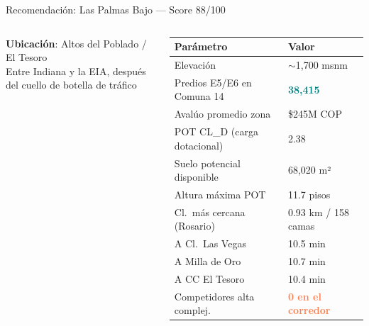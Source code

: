 \documentclass[aspectratio=169, 11pt]{beamer}
\newcommand{\highlight}[1]{\textcolor{teal}{\textbf{#1}}}
\newcommand{\danger}[1]{\textcolor{coral}{\textbf{#1}}}
\begin{document}
{
\begin{frame}{Recomendación: Las Palmas Bajo — Score 88/100}

\begin{columns}[T]
\textbf{Ubicación}: Altos del Poblado / El Tesoro\\
{\footnotesize Entre Indiana y la EIA, después del cuello de botella de tráfico}

\vspace{8pt}

{\footnotesize
\begin{tabular}{@{}p{3.8cm}l@{}}
\toprule
\textbf{Parámetro} & \textbf{Valor} \\
\midrule
Elevación & $\sim$1,700 msnm \\
Predios E5/E6 en Comuna 14 & \highlight{38,415} \\
Avalúo promedio zona & \$245M COP \\
POT CL\_D (carga dotacional) & 2.38 \\
Suelo potencial disponible & 68,020 m² \\
Altura máxima POT & 11.7 pisos \\
Cl.\ más cercana (Rosario) & 0.93 km / 158 camas \\
A Cl.\ Las Vegas & 10.5 min \\
A Milla de Oro & 10.7 min \\
A CC El Tesoro & 10.4 min \\
Competidores alta complej. & \danger{0 en el corredor} \\
\bottomrule
\end{tabular}
}


\end{columns}
\end{frame}}
\end{document}
